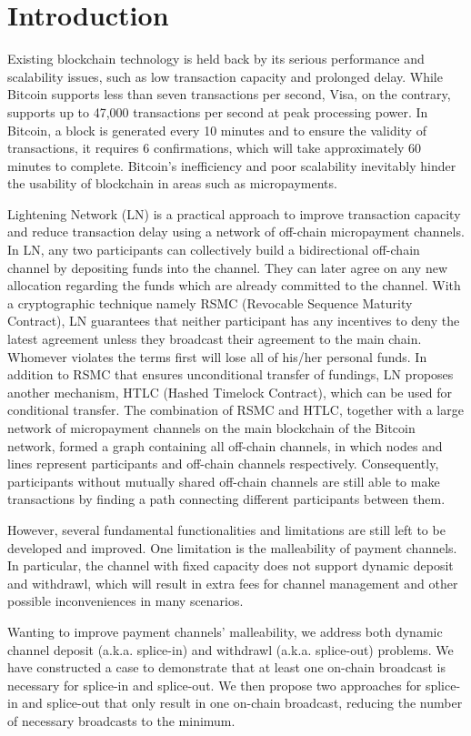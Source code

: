 \section{Introduction}
\label{sec:introduction}


Existing blockchain technology is held back by its serious performance and scalability issues, such as low transaction capacity and prolonged delay. While Bitcoin\cite{nakamoto2008bitcoin} supports less than seven transactions per second, Visa, on the contrary, supports up to 47,000 transactions per second at peak processing power. In Bitcoin, a block is generated every 10 minutes and to ensure the validity of transactions, it requires 6 confirmations, which will take approximately 60 minutes to complete. Bitcoin’s inefficiency and poor scalability inevitably hinder the usability of blockchain in areas such as micropayments.
 
Lightening Network (LN)\cite{poon2015bitcoin} is a practical approach to improve transaction capacity and reduce transaction delay using a network of off-chain micropayment channels\cite{DBLP:journals/corr/LindEPS16}. In LN, any two participants can collectively build a bidirectional off-chain channel by depositing funds into the channel. They can later agree on any new allocation regarding the funds which are already committed to the channel. With a cryptographic technique namely RSMC (Revocable Sequence Maturity Contract), LN guarantees that neither participant has any incentives to deny the latest agreement unless they broadcast their agreement to the main chain. Whomever violates the terms first will lose all of his/her personal funds. In addition to RSMC that ensures unconditional transfer of fundings, LN proposes another mechanism, HTLC (Hashed Timelock Contract), which can be used for conditional transfer. The combination of RSMC and HTLC, together with a large network of micropayment channels on the main blockchain of the Bitcoin network, formed a graph containing all off-chain channels, in which nodes and lines represent participants and off-chain channels respectively. Consequently, participants without mutually shared off-chain channels are still able to make transactions by finding a path connecting different participants between them.

However, several fundamental functionalities and limitations are still left to be developed and improved. One limitation is the malleability of payment channels. In particular, the channel with fixed capacity does not support dynamic deposit and withdrawl, which will result in extra fees for channel management and other possible inconveniences in many scenarios.

Wanting to improve payment channels’ malleability, we address both dynamic channel deposit (a.k.a. splice-in) and withdrawl (a.k.a. splice-out) problems. We have constructed a case to demonstrate that at least one on-chain broadcast is necessary for splice-in and splice-out. We then propose two approaches for splice-in and splice-out that only result in one on-chain broadcast, reducing the number of necessary broadcasts to the minimum.